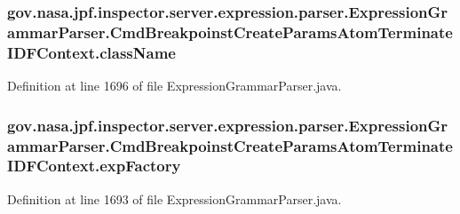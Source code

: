 \subsubsection[{\texorpdfstring{class\+Name}{className}}]{ gov.\+nasa.\+jpf.\+inspector.\+server.\+expression.\+parser.\+Expression\+Grammar\+Parser.\+Cmd\+Breakpoinst\+Create\+Params\+Atom\+Terminate\+I\+D\+F\+Context.\+class\+Name}\hypertarget{classgov_1_1nasa_1_1jpf_1_1inspector_1_1server_1_1expression_1_1parser_1_1_expression_grammar_pa33db42909734e187834b73b54c5beb59_a457af7c627d91be421a51cf0fd1ec612}{}\label{classgov_1_1nasa_1_1jpf_1_1inspector_1_1server_1_1expression_1_1parser_1_1_expression_grammar_pa33db42909734e187834b73b54c5beb59_a457af7c627d91be421a51cf0fd1ec612}


Definition at line 1696 of file Expression\+Grammar\+Parser.\+java.

\subsubsection[{\texorpdfstring{exp\+Factory}{expFactory}}]{ gov.\+nasa.\+jpf.\+inspector.\+server.\+expression.\+parser.\+Expression\+Grammar\+Parser.\+Cmd\+Breakpoinst\+Create\+Params\+Atom\+Terminate\+I\+D\+F\+Context.\+exp\+Factory}\hypertarget{classgov_1_1nasa_1_1jpf_1_1inspector_1_1server_1_1expression_1_1parser_1_1_expression_grammar_pa33db42909734e187834b73b54c5beb59_ab0877aa4b38711c005d01594ed01fd65}{}\label{classgov_1_1nasa_1_1jpf_1_1inspector_1_1server_1_1expression_1_1parser_1_1_expression_grammar_pa33db42909734e187834b73b54c5beb59_ab0877aa4b38711c005d01594ed01fd65}


Definition at line 1693 of file Expression\+Grammar\+Parser.\+java.

